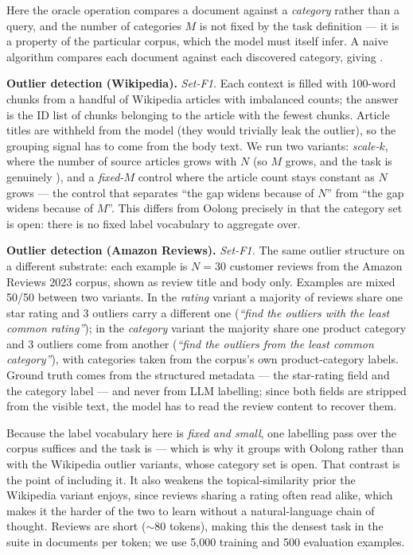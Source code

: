 Here the oracle operation compares a document against a \emph{category} rather than a query, and the number of categories $M$ is not fixed by the task definition --- it is a property of the particular corpus, which the model must itself infer. A naive algorithm compares each document against each discovered category, giving .

\textbf{Outlier detection (Wikipedia).} \emph{Set-F1.} Each context is filled with 100-word chunks from a handful of Wikipedia articles with imbalanced counts; the answer is the ID list of chunks belonging to the article with the fewest chunks. Article titles are withheld from the model (they would trivially leak the outlier), so the grouping signal has to come from the body text. We run two variants: \emph{scale-$k$}, where the number of source articles grows with $N$ (so $M$ grows, and the task is genuinely ), and a \emph{fixed-$M$} control where the article count stays constant as $N$ grows --- the control that separates ``the gap widens because of $N$'' from ``the gap widens because of $M$''. This differs from Oolong precisely in that the category set is open: there is no fixed label vocabulary to aggregate over.

\begin{claudeblock}
\textbf{Outlier detection (Amazon Reviews).} \emph{Set-F1.} The same outlier structure on a
different substrate: each example is $N{=}30$ customer reviews from the Amazon Reviews 2023 corpus,
shown as review title and body only. Examples are mixed 50/50 between two variants. In the
\emph{rating} variant a majority of reviews share one star rating and 3 outliers carry a different
one (\emph{``find the outliers with the least common rating''}); in the \emph{category} variant the
majority share one product category and 3 outliers come from another (\emph{``find the outliers
from the least common category''}), with categories taken from the corpus's own product-category
labels. Ground truth comes from the structured metadata --- the star-rating field and the category
label --- and never from LLM labelling; since both fields are stripped from the visible text, the
model has to read the review content to recover them.

Because the label vocabulary here is \emph{fixed and small}, one labelling pass over the corpus
suffices and the task is  --- which is why it groups with Oolong rather than with the
Wikipedia outlier variants, whose category set is open. That contrast is the point of including
it. It also weakens the topical-similarity prior the Wikipedia variant enjoys, since reviews
sharing a rating often read alike, which makes it the harder of the two to learn without a
natural-language chain of thought. Reviews are short ($\sim$80 tokens), making this the densest
task in the suite in documents per token; we use 5{,}000 training and 500 evaluation examples.
\end{claudeblock}

